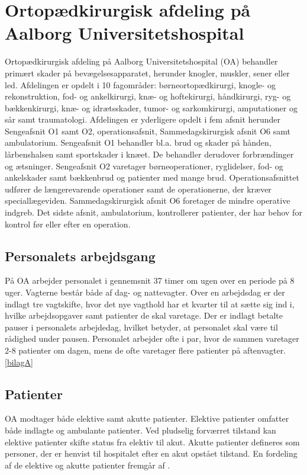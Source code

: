 \section{Ortopædkirurgisk afdeling på Aalborg Universitetshospital}
Ortopædkirurgisk afdeling på Aalborg Universitetshospital (OA) behandler primært skader på bevægelsesapparatet, herunder knogler, muskler, sener eller led. Afdelingen er opdelt i 10 fagområder: børneortopædkirurgi, knogle- og rekonstruktion, fod- og ankelkirurgi, knæ- og hoftekirurgi, håndkirurgi, ryg- og bækkenkirurgi, knæ- og idrætsskader, tumor- og sarkomkirurgi, amputationer og sår samt traumatologi. Afdelingen er yderligere opdelt i fem afsnit herunder Sengeafsnit O1 samt O2, operationsafsnit, Sammedagskirurgisk afsnit O6 samt ambulatorium. 
Sengeafsnit O1 behandler bl.a. brud og skader på hånden, lårbenshalsen samt sportskader i knæet. De behandler derudover forbrændinger og ætsninger. Sengeafsnit O2 varetager børneoperationer, ryglidelser, fod- og ankelskader samt bækkenbrud og patienter med mange brud. Operationsafsnittet udfører de længerevarende operationer samt de operationerne, der kræver speciallægeviden. Sammedagskirurgisk afsnit O6 foretager de mindre operative indgreb. Det sidste afsnit, ambulatorium, kontrollerer patienter, der har behov for kontrol før eller efter en operation.\cite{Aalborg2016}

\subsection{Personalets arbejdsgang}
På OA arbejder personalet i gennemsnit 37 timer om ugen\cite{Danske2015} over en periode på 8 uger. Vagterne består både af dag- og nattevagter. Over en arbejdsdag er der indlagt tre vagtskifte, hvor det nye vagthold har et kvarter til at sætte sig ind i, hvilke arbejdsopgaver samt patienter de skal varetage. Der er indlagt betalte pauser i personalets arbejdedag, hvilket betyder, at personalet skal være til rådighed under pausen. Personalet arbejder ofte i par, hvor de sammen varetager 2-8 patienter om dagen, mens de ofte varetager flere patienter på aftenvagter.\ref{bilagA}

\subsection{Patienter}
OA modtager både elektive samt akutte patienter. Elektive patienter omfatter både indlagte og ambulante patienter. Ved pludselig forværret tilstand kan elektive patienter skifte status fra elektiv til akut. Akutte patienter defineres som personer, der er henvist til hospitalet efter en akut opstået tilstand.\cite{RegionNord2016} En fordeling af de elektive og akutte patienter fremgår af .

